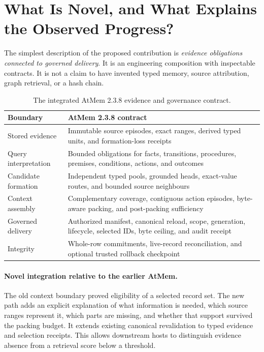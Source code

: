 \documentclass[11pt]{article}
\begin{document}
\section{What Is Novel, and What Explains the Observed Progress?}
\label{sec:novelty}
The simplest description of the proposed contribution is \emph{evidence obligations connected to governed delivery}. It is an engineering composition with inspectable contracts. It is not a claim to have invented typed memory, source attribution, graph retrieval, or a hash chain.

\begin{table}[t]
\centering\small
\begin{tabularx}{\linewidth}{p{.24\linewidth}Y}
\toprule
Boundary & AtMem 2.3.8 contract\\\midrule
Stored evidence & Immutable source episodes, exact ranges, derived typed units, and formation-loss receipts\\
Query interpretation & Bounded obligations for facts, transitions, procedures, premises, conditions, actions, and outcomes\\
Candidate formation & Independent typed pools, grounded heads, exact-value routes, and bounded source neighbours\\
Context assembly & Complementary coverage, contiguous action episodes, byte-aware packing, and post-packing sufficiency\\
Governed delivery & Authorized manifest, canonical reload, scope, generation, lifecycle, selected IDs, byte ceiling, and audit receipt\\
Integrity & Whole-row commitments, live-record reconciliation, and optional trusted rollback checkpoint\\\bottomrule
\end{tabularx}
\caption{The integrated AtMem 2.3.8 evidence and governance contract.}
\label{tab:system-contract}
\end{table}

\paragraph{Novel integration relative to the earlier AtMem.}
The old context boundary proved eligibility of a selected record set. The new path adds an explicit explanation of what information is needed, which source ranges represent it, which parts are missing, and whether that support survived the packing budget. It extends existing canonical revalidation to typed evidence and selection receipts. This allows downstream hosts to distinguish evidence absence from a retrieval score below a threshold.
\end{document}
